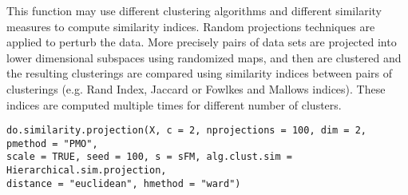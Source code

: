 \documentclass{article}
\begin{document}
\begin{Description}\relax
This function may use different clustering algorithms and different similarity measures to compute similarity indices.
Random projections techniques are applied to perturb the data. 
More precisely pairs of data sets are projected into lower dimensional subspaces using randomized maps,
and then are clustered and the resulting clusterings are compared using similarity indices between pairs of clusterings
(e.g. Rand Index, Jaccard or Fowlkes and Mallows indices). These indices are computed multiple times for different number of clusters.
\end{Description}
\begin{Usage}
\begin{verbatim}
do.similarity.projection(X, c = 2, nprojections = 100, dim = 2, pmethod = "PMO", 
scale = TRUE, seed = 100, s = sFM, alg.clust.sim = Hierarchical.sim.projection, 
distance = "euclidean", hmethod = "ward")
\end{verbatim}
\end{Usage}
\end{document}
